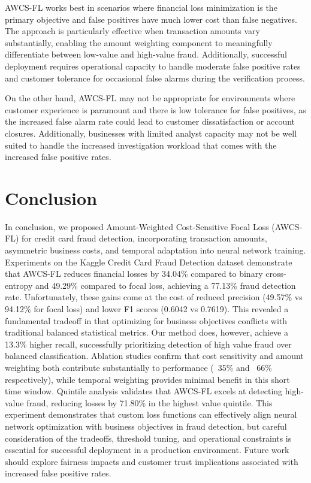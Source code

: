 \documentclass[10pt,twocolumn,letterpaper]{article}
\begin{document}
AWCS-FL works best in scenarios where financial loss minimization is the primary objective and false positives have much lower cost than false negatives. The approach is particularly effective when transaction amounts vary substantially, enabling the amount weighting component to meaningfully differentiate between low-value and high-value fraud. Additionally, successful deployment requires operational capacity to handle moderate false positive rates and customer tolerance for occasional false alarms during the verification process.

On the other hand, AWCS-FL may not be appropriate for environments where customer experience is paramount and there is low tolerance for false positives, as the increased false alarm rate could lead to customer dissatisfaction or account closures. Additionally, businesses with limited analyst capacity may not be well suited to handle the increased investigation workload that comes with the increased false positive rates.

\section{Conclusion}

In conclusion, we proposed Amount-Weighted Cost-Sensitive Focal Loss (AWCS-FL) for credit card fraud detection, incorporating transaction amounts, asymmetric business costs, and temporal adaptation into neural network training. Experiments on the Kaggle Credit Card Fraud Detection dataset demonstrate that AWCS-FL reduces financial losses by 34.04\% compared to binary cross-entropy and 49.29\% compared to focal loss, achieving a 77.13\% fraud detection rate.
Unfortunately, these gains come at the cost of reduced precision (49.57\% vs 94.12\% for focal loss) and lower F1 scores (0.6042 vs 0.7619). This revealed a fundamental tradeoff in that optimizing for business objectives conflicts with traditional balanced statistical metrics. Our method does, however, achieve a 13.3\% higher recall, successfully prioritizing detection of high value fraud over balanced classification.
Ablation studies confirm that cost sensitivity and amount weighting both contribute substantially to performance (~35\% and ~66\% respectively), while temporal weighting provides minimal benefit in this short time window. Quintile analysis validates that AWCS-FL excels at detecting high-value fraud, reducing losses by 71.80\% in the highest value quintile.
This experiment demonstrates that custom loss functions can effectively align neural network optimization with business objectives in fraud detection, but careful consideration of the tradeoffs, threshold tuning, and operational constraints is essential for successful deployment in a production environment. Future work should explore fairness impacts and customer trust implications associated with increased false positive rates.
\end{document}
